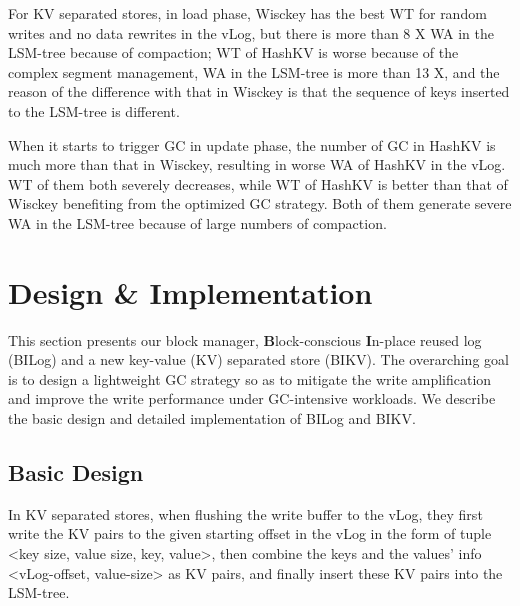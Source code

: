\documentclass[sigconf]{acmart}
\begin{document}
For KV separated stores, in load phase, Wisckey has the best WT for random writes and no data rewrites in the vLog, but there is more than 8 X WA in the LSM-tree because of compaction; WT of HashKV is worse because of the complex segment management, WA in the LSM-tree is more than 13 X, and the reason of the difference with that in Wisckey is that the sequence of keys inserted to the LSM-tree is different.

When it starts to trigger GC in update phase, the number of GC in HashKV is much more than that in Wisckey, resulting in worse WA of HashKV in the vLog. WT of them both severely decreases, while WT of HashKV is better than that of Wisckey benefiting from the optimized GC strategy. Both of them generate severe WA in the LSM-tree because of large numbers of compaction. 



\section{Design \& Implementation}
This section presents our block manager, \textbf{B}lock-conscious \textbf{I}n-place reused log (BILog) and a new key-value (KV) separated store (BIKV). The overarching goal is to design a lightweight GC strategy so as to mitigate the write amplification and improve the write performance under GC-intensive workloads. We describe the basic design and detailed implementation of BILog and BIKV.

\subsection{Basic Design}
In KV separated stores, when flushing the write buffer to the vLog, they first write the KV pairs to the given starting offset in the vLog in the form of tuple \textless key size, value size, key, value\textgreater, then combine the keys and the values’ info \textless vLog-offset, value-size\textgreater{} as KV pairs, and finally insert these KV pairs into the LSM-tree.
\end{document}
